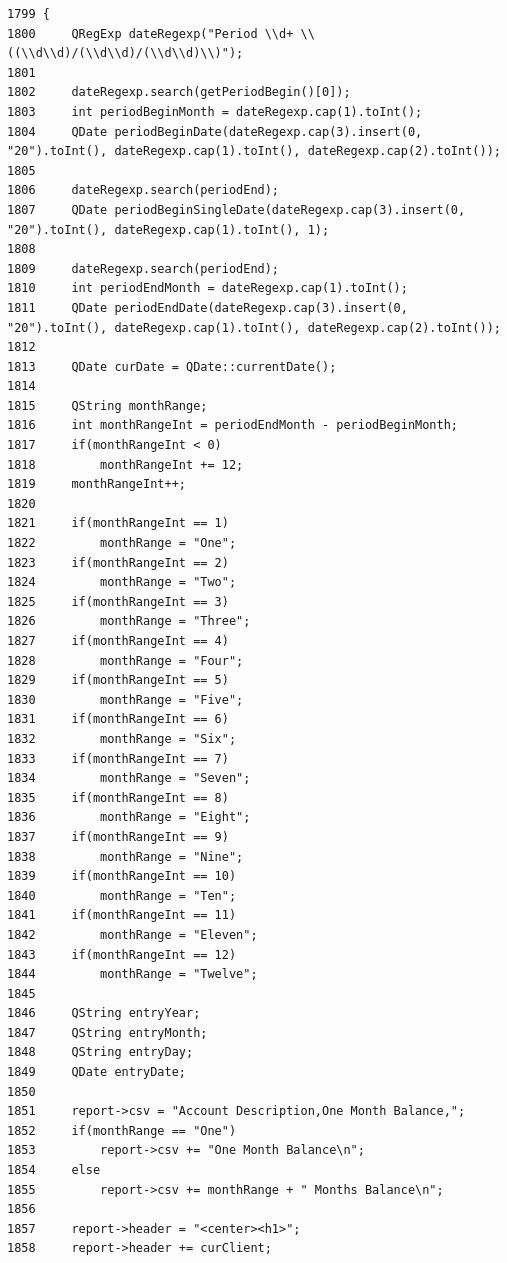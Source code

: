 \footnotesize\begin{verbatim}1799 {
1800     QRegExp dateRegexp("Period \\d+ \\((\\d\\d)/(\\d\\d)/(\\d\\d)\\)");
1801 
1802     dateRegexp.search(getPeriodBegin()[0]);
1803     int periodBeginMonth = dateRegexp.cap(1).toInt();
1804     QDate periodBeginDate(dateRegexp.cap(3).insert(0, "20").toInt(), dateRegexp.cap(1).toInt(), dateRegexp.cap(2).toInt());
1805 
1806     dateRegexp.search(periodEnd);
1807     QDate periodBeginSingleDate(dateRegexp.cap(3).insert(0, "20").toInt(), dateRegexp.cap(1).toInt(), 1);
1808 
1809     dateRegexp.search(periodEnd);
1810     int periodEndMonth = dateRegexp.cap(1).toInt();
1811     QDate periodEndDate(dateRegexp.cap(3).insert(0, "20").toInt(), dateRegexp.cap(1).toInt(), dateRegexp.cap(2).toInt());
1812 
1813     QDate curDate = QDate::currentDate();
1814 
1815     QString monthRange;
1816     int monthRangeInt = periodEndMonth - periodBeginMonth;
1817     if(monthRangeInt < 0)
1818         monthRangeInt += 12;
1819     monthRangeInt++;
1820 
1821     if(monthRangeInt == 1)
1822         monthRange = "One";
1823     if(monthRangeInt == 2)
1824         monthRange = "Two";
1825     if(monthRangeInt == 3)
1826         monthRange = "Three";
1827     if(monthRangeInt == 4)
1828         monthRange = "Four";
1829     if(monthRangeInt == 5)
1830         monthRange = "Five";
1831     if(monthRangeInt == 6)
1832         monthRange = "Six";
1833     if(monthRangeInt == 7)
1834         monthRange = "Seven";
1835     if(monthRangeInt == 8)
1836         monthRange = "Eight";
1837     if(monthRangeInt == 9)
1838         monthRange = "Nine";
1839     if(monthRangeInt == 10)
1840         monthRange = "Ten";
1841     if(monthRangeInt == 11)
1842         monthRange = "Eleven";
1843     if(monthRangeInt == 12)
1844         monthRange = "Twelve";
1845 
1846     QString entryYear;
1847     QString entryMonth;
1848     QString entryDay;
1849     QDate entryDate;
1850 
1851     report->csv = "Account Description,One Month Balance,";
1852     if(monthRange == "One")
1853         report->csv += "One Month Balance\n";
1854     else
1855         report->csv += monthRange + " Months Balance\n";
1856 
1857     report->header = "<center><h1>";
1858     report->header += curClient;

\end{verbatim}
